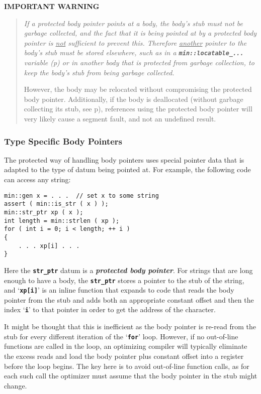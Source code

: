 \documentclass[12pt]{article}
\newcommand{\TT}[1]{{\tt \bfseries #1}}
\newcommand{\key}[1]{{\bf \em #1}\index{#1}}
\newcommand{\pagref}[1]{p\pageref{#1}}
\newcommand{\EOL}{\penalty \exhyphenpenalty}
\newenvironment{indpar}[1][0.3in]%
	{\begin{list}{}%
		     {\setlength{\itemsep}{0in}%
		      \setlength{\topsep}{0in}%
		      \setlength{\parsep}{1ex}%
		      \setlength{\labelwidth}{#1}%
		      \setlength{\leftmargin}{#1}%
		      \addtolength{\leftmargin}{\labelsep}}%
	 \item}%
	{\end{list}}
\begin{document}
\centerline{\large \bf IMPORTANT WARNING}

\begin{quote} \it
If a protected body pointer points at a body, the body's stub must not
be garbage collected, and the fact that it is being pointed at
by a protected body pointer is \underline{not} sufficient to
prevent this.  Therefore \underline{another}
pointer to the body's stub must
be stored elsewhere, such as in a \TT{min::\EOL locatable\_...}
variable (\pagref{LOCATABLE-VARIABLES}) or in another body that
is protected from garbage collection,
to keep the body's stub from being garbage collected.

However,
the body may be relocated without compromising the protected body
pointer.  Additionally, if the body is deallocated (without
garbage collecting its stub, see \pagref{MIN::DEALLOCATE}),
references using the protected body pointer will very likely
cause a segment fault, and not an undefined result.
\end{quote}

\subsubsection{Type Specific Body Pointers}
\label{TYPE-SPECIFIC-BODY-POINTERS}

The protected way of handling body pointers
uses special pointer data that is adapted to
the type of datum being pointed at.  For example, the following
code can access any string:
\begin{indpar}\begin{verbatim}
min::gen x = . . .  // set x to some string
assert ( min::is_str ( x ) );
min::str_ptr xp ( x );
int length = min::strlen ( xp );
for ( int i = 0; i < length; ++ i )
{
    . . . xp[i] . . .
}
\end{verbatim}\end{indpar}

Here the \TT{str\_ptr} datum is a \key{protected body pointer}.
For strings that are long enough to have a body, the
\TT{str\_ptr} stores a pointer to the stub of the string,
and `\TT{xp[i]}' is an inline function that expands to
code that reads the body pointer from the stub and adds both
an appropriate constant offset and then the index `\TT{i}'
to that pointer in order to get the address of the character.

It might be thought that this is inefficient as the body pointer
is re-read from the stub for every different iteration of the `\TT{for}'
loop.  However, if no out-of-line functions are called in the
loop, an optimizing compiler will typically eliminate
the excess reads and load the body pointer plus constant offset
into a register before the loop begins.  The key here is to
avoid out-of-line function calls, as for each such call the
optimizer must assume that the body pointer in the stub might
change.
\end{document}
